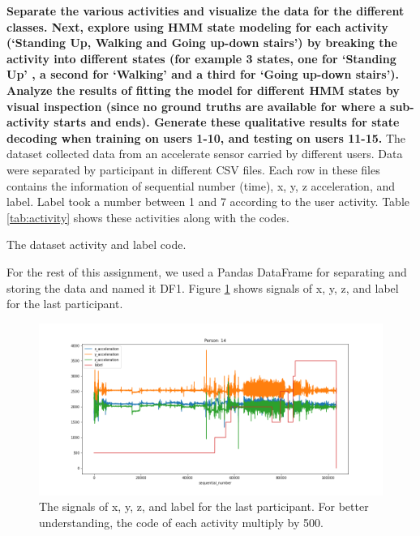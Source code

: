 \item \textbf{Separate the  various  activities  and  visualize  the  data  for  the  different  classes.  Next,  explore  using HMM  state  modeling  for  each activity (‘Standing  Up,  Walking  and  Going  up-down  stairs’)  by breaking  the activity into different states (for example 3 states, one for ‘Standing Up’  ,  a second for ‘Walking’  and a third  for  ‘Going  up-down  stairs’).  Analyze  the  results  of fitting  the  model  for different  HMM  states  by visual  inspection  (since  no  ground  truths  are available for where  a  sub-activity  starts  and  ends).  Generate  these  qualitative  results  for  state  decoding  when training  on  users 1-10, and testing  on users 11-15.}
The dataset collected data from an accelerate sensor carried by different users. Data were separated by participant in different CSV files. Each row in these files contains the information of sequential number (time), x, y, z acceleration, and label. Label took a number between 1 and 7 according to the user activity. Table \ref{tab:activity} shows these activities along with the codes.
\begin{table}[H]
\centering
\caption{The dataset activity and label code.}
\label{tab:activity}

\end{table}
For the rest of this assignment, we used a Pandas DataFrame for separating and storing the data and named it DF1. Figure \ref{fig:Ass3_Q2_raw_signal_2} shows signals of x, y, z, and label for the last participant.
\begin{figure}[H]
    \centering
    \begin{minipage}[b]{1\textwidth}
        \includegraphics[width=\textwidth]{figures/Ass3/Ass3_Q2_raw_signal_21.png}
    \end{minipage}
    \caption{The signals of x, y, z, and label for the last participant. For better understanding, the code of each activity multiply by 500.}
    \label{fig:Ass3_Q2_raw_signal_2}
\end{figure}

